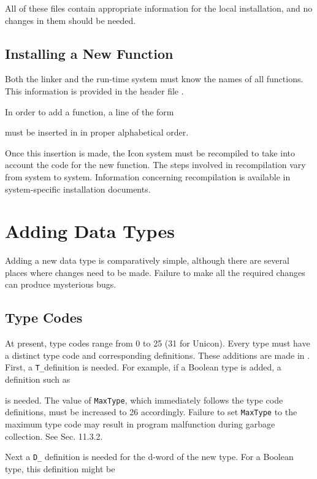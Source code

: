 \noindent
All of these files contain appropriate information for the local
installation, and no changes in them should be needed.


\subsection{Installing a New Function}

Both the linker and the run-time system must know the names of all
functions. This information is provided in the header file .


In order to add a function, a line of the form

\noindent must be inserted in  in proper alphabetical order.

Once this insertion is made, the Icon system must be recompiled to
take into account the code for the new function. The steps involved in
recompilation vary from system to system. Information concerning
recompilation is available in system-specific installation documents.

\section{Adding Data Types}

Adding a new data type is comparatively simple, although there are
several places where changes need to be made. Failure to make all the
required changes can produce mysterious bugs.

\subsection{Type Codes}

At present, type codes range from 0 to 25 {\color{blue} (31 for
Unicon)}. Every type must have a distinct type code and corresponding
definitions.  These additions are made in . First, a
\texttt{T\_}definition is needed. For example, if a Boolean type is added,
a definition such as


\noindent is needed. The value of \texttt{MaxType}, which immediately follows
the type code definitions, must be increased to 26 accordingly.
Failure to set \texttt{MaxType} to the maximum type code may result in
program malfunction during garbage collection. See Sec. 11.3.2.

Next a \texttt{D\_} definition is needed for the d-word of the new type.
For a Boolean type, this definition might be

